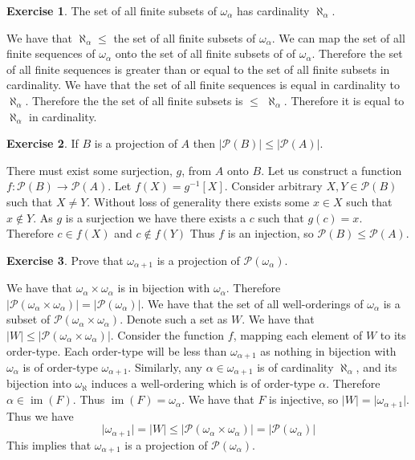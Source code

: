 \documentclass{article}
\theoremstyle{definition}
\newtheorem{exer}{Exercise}[section]
\newcommand{\powset}[1]{\mathcal{P}(#1)}
\DeclareMathOperator{\im}{im}
\newcommand{\abs}[1]{\lvert#1\rvert}
\newlength{\defparindent}
\newenvironment{answer}
    {\begin{mdframed}[backgroundcolor=gray!15, linewidth=0pt] \setlength{\parindent}{\defparindent}}
    {\end{mdframed}}
\begin{document}
\begin{exer}
    The set of all finite subsets of $\omega_\alpha$ has cardinality $\aleph_\alpha$.
    \begin{answer}
        We have that $\aleph_\alpha \le$ the set of all finite subsets of $\omega_\alpha$. We can map the set of all finite sequences of $\omega_\alpha$ onto the set of all finite subsets of of $\omega_\alpha$. Therefore the set of all finite sequences is greater than or equal to the set of all finite subsets in cardinality. We have that the set of all finite sequences is equal in cardinality to $\aleph_\alpha$. Therefore the the set of all finite subsets is $\le$ $\aleph_\alpha$. Therefore it is equal to $\aleph_\alpha$ in cardinality.
    \end{answer}
\end{exer}

\begin{exer}
    If $B$ is a projection of $A$ then $\abs{\powset{B}} \le \abs{\powset{A}}$.
    \begin{answer}
        There must exist some surjection, $g$, from $A$ onto $B$. Let us construct a function $f: \powset{B} \to \powset{A}$. Let $f(X) = g^{-1}[X]$. Consider arbitrary $X, Y \in \powset{B}$ such that $X \ne Y$. Without loss of generality there exists some $x \in X$ such that $x \not\in Y$. As $g$ is a surjection we have there exists a $c$ such that $g(c) = x$. Therefore $c \in f(X)$ and $c \not\in f(Y)$ Thus $f$ is an injection, so $\powset{B} \le \powset{A}$.
    \end{answer}
\end{exer}

\begin{exer}
    Prove that $\omega_{\alpha + 1}$ is a projection of $\powset{\omega_\alpha}$.
    \begin{answer}
        We have that $\omega_\alpha \times \omega_\alpha$ is in bijection with $\omega_\alpha$. Therefore $\abs{\powset{\omega_\alpha \times \omega_\alpha}} = \abs{\powset{\omega_\alpha}}$. We have that the set of all well-orderings of $\omega_\alpha$ is a subset of $\powset{\omega_\alpha \times \omega_\alpha}$. Denote such a set as $W$. We have that $\abs{W} \le \abs{\powset{\omega_\alpha \times \omega_\alpha}}$. Consider the function $f$, mapping each element of $W$ to its order-type. Each order-type will be less than $\omega_{\alpha + 1}$ as nothing in bijection with $\omega_\alpha$ is of order-type $\omega_{\alpha + 1}$. Similarly, any $\alpha \in \omega_{\alpha + 1}$ is of cardinality $\aleph_\alpha$, and its bijection into $\omega_\aleph$ induces a well-ordering which is of order-type $\alpha$. Therefore $\alpha \in \im(F)$. Thus $\im(F) = \omega_\alpha$. We have that $F$ is injective, so $\abs{W} = \abs{\omega_{\alpha + 1}}$. Thus we have  
        \[
            \abs{\omega_{\alpha + 1}} 
            =
            \abs{W}
            \le 
            \abs{\powset{\omega_\alpha \times \omega_\alpha}}
            =
            \abs{\powset{\omega_\alpha}}  
        \]
        This implies that $\omega_{\alpha + 1}$ is a projection of $\powset{\omega_\alpha}$. 
    \end{answer}
\end{exer}
\end{document}
